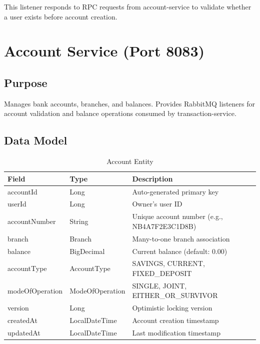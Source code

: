 \documentclass[12pt,a4paper]{report}
\begin{document}
This listener responds to RPC requests from account-service to validate whether a user exists before account creation.

\section{Account Service (Port 8083)}

\subsection{Purpose}
Manages bank accounts, branches, and balances. Provides RabbitMQ listeners for account validation and balance operations consumed by transaction-service.

\subsection{Data Model}

\begin{table}[H]
\centering
\caption{Account Entity}
\begin{tabularx}{\textwidth}{llX}
\toprule
\textbf{Field} & \textbf{Type} & \textbf{Description} \\
\midrule
accountId & Long & Auto-generated primary key \\
userId & Long & Owner's user ID \\
accountNumber & String & Unique account number (e.g., NB4A7F2E3C1D8B) \\
branch & Branch & Many-to-one branch association \\
balance & BigDecimal & Current balance (default: 0.00) \\
accountType & AccountType & SAVINGS, CURRENT, FIXED\_DEPOSIT \\
modeOfOperation & ModeOfOperation & SINGLE, JOINT, EITHER\_OR\_SURVIVOR \\
version & Long & Optimistic locking version \\
createdAt & LocalDateTime & Account creation timestamp \\
updatedAt & LocalDateTime & Last modification timestamp \\
\bottomrule
\end{tabularx}
\end{table}
\end{document}
